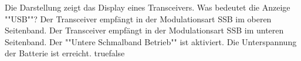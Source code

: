     {Die Darstellung zeigt das Display eines Transceivers. Was bedeutet die Anzeige ""USB""?}
    {Der Transceiver empfängt in der Modulationsart SSB im oberen Seitenband.}
    {Der Transceiver empfängt in der Modulationsart SSB im unteren Seitenband.}
    {Der ""Untere Schmalband Betrieb"" ist aktiviert. }
    {Die Unterspannung der Batterie ist erreicht.}
    {true}{false}